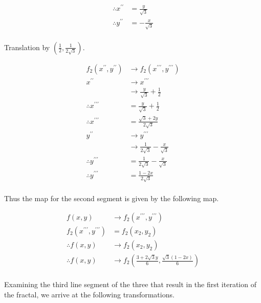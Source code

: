 \documentclass[a4paper]{article}
\begin{document}
\begin{enumerate}[label=\textbf{\arabic*.}]
\begin{enumerate}
		\begin{align*}
		\therefore x^{\prime \prime} & = \frac{y}{\sqrt{3}}\\
		\therefore y^{\prime \prime} & = -\frac{x}{\sqrt{3}}\\
		\end{align*}

		\pagebreak

		\begin{center}
		Translation by $\left(\frac{1}{2},\frac{1}{2\sqrt{3}}\right)$.
		\end{center}

		\begin{align*}
		f_2(x^{\prime \prime},y^{\prime \prime}) & \rightarrow f_2(x^{\prime \prime \prime},y^{\prime \prime \prime})\\
		x^{\prime \prime} & \rightarrow x^{\prime \prime \prime}\\
		& \rightarrow \frac{y}{\sqrt{3}} + \frac{1}{2}\\
		\therefore x^{\prime \prime \prime} & = \frac{y}{\sqrt{3}} + \frac{1}{2}\\
		\therefore x^{\prime \prime \prime} & = \frac{\sqrt{3} + 2y}{2\sqrt{3}}\\
		y^{\prime \prime} & \rightarrow y^{\prime \prime \prime}\\
		& \rightarrow \frac{1}{2\sqrt{3}} - \frac{x}{\sqrt{3}}\\
		\therefore y^{\prime \prime \prime} & = \frac{1}{2\sqrt{3}} - \frac{x}{\sqrt{3}}\\
		\therefore y^{\prime \prime \prime} & = \frac{1-2x}{2\sqrt{3}}\\
		\end{align*}

		Thus the map for the second segment is given by the following map.

		\begin{align*}
		f(x,y) & \rightarrow f_2(x^{\prime \prime \prime},y^{\prime \prime \prime})\\
		f_2(x^{\prime \prime \prime},y^{\prime \prime \prime})& = f_2(x_2,y_2)\\
		\therefore f(x,y) & \rightarrow f_2(x_2,y_2)\\
		\therefore f(x,y) & \rightarrow f_2\left(\frac{3 + 2\sqrt{3}y}{6},\frac{\sqrt{3}(1-2x)}{6}\right)\\
		\end{align*}

		Examining the third line segment of the three that result in the first iteration of the fractal, we arrive at the following transformations.


\end{enumerate}
\end{enumerate}
\end{document}
